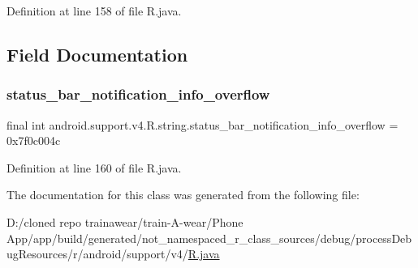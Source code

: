 Definition at line 158 of file R.\+java.


\begin{DoxyCode}{0}

\end{DoxyCode}


\subsection{Field Documentation}
\mbox{\label{classandroid_1_1support_1_1v4_1_1_r_1_1string_ad88576c15d5591bc789ca0c9f54796d2}} 
\subsubsection{\texorpdfstring{status\_bar\_notification\_info\_overflow}{status\_bar\_notification\_info\_overflow}}
{\footnotesize\ttfamily final int android.\+support.\+v4.\+R.\+string.\+status\+\_\+bar\+\_\+notification\+\_\+info\+\_\+overflow = 0x7f0c004c\hspace{0.3cm}{\ttfamily [static]}}



Definition at line 160 of file R.\+java.



The documentation for this class was generated from the following file\+:\begin{DoxyCompactItemize}
\item 
D\+:/cloned repo trainawear/train-\/\+A-\/wear/\+Phone App/app/build/generated/not\+\_\+namespaced\+\_\+r\+\_\+class\+\_\+sources/debug/process\+Debug\+Resources/r/android/support/v4/\mbox{\hyperlink{process_debug_resources_2r_2android_2support_2v4_2_r_8java}{R.\+java}}\end{DoxyCompactItemize}
